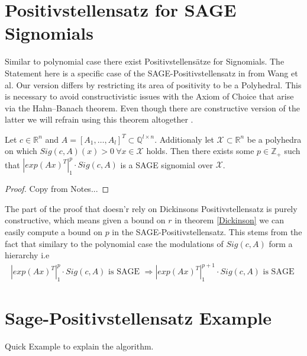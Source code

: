 \documentclass[./main.tex]{subfiles}
\begin{document}
\section{Positivstellensatz for SAGE Signomials}
Similar to polynomial case there exist Positivstellensätze for Signomials. The Statement here is a specific case of the SAGE-Positivstellensatz in \cite{wang2020positivstellensatz} from Wang et al. Our version differs by restricting its area of positivity to be a Polyhedral. This is necessary to avoid constructivistic issues with the Axiom of Choice that arise  via the Hahn–Banach theorem. Even though there are constructive version of the latter we will refrain using this theorem altogether .
\begin{thm}
\label{SAGEthm}

 Let $c \in \mathbb{R}^n$ and $A = \left[A_1,\dots, A_l \right]^T \subset \mathbb{Q}^{l\times n}$. Additionaly let $\mathcal{X} \subset \mathbb{R}^n$ be a polyhedra on which $Sig(c,A)(x) > 0 \ \forall x \in \mathcal{X}$ holds. Then there exists some $p \in \mathbb{Z}_+$ such that $|exp(Ax)^T|^p_1 \cdot Sig(c,A)$ is a SAGE signomial over $\mathcal{X}$.
\begin{proof}
Copy from Notes...
\end{proof}
\end{thm}
The part of the proof that doesn'r rely on Dickinsons Positivstellensatz  is purely constructive, which means given a bound on $r$ in theorem \ref{Dickinson} we can easily compute a bound on $p$ in the SAGE-Positivstellensatz. This stems from the fact that similary to the polynomial case the modulations of $Sig(c,A)$ form a hierarchy i.e 
\begin{align*}
 |exp(Ax)^T|^p_1 \cdot Sig(c,A) \text{ is SAGE } \Rightarrow |exp(Ax)^T|^{p+1}_1 \cdot Sig(c,A) \text{ is SAGE }
\end{align*}
\section{Sage-Positivstellensatz Example}
Quick Example to explain the algorithm.
\end{document}
